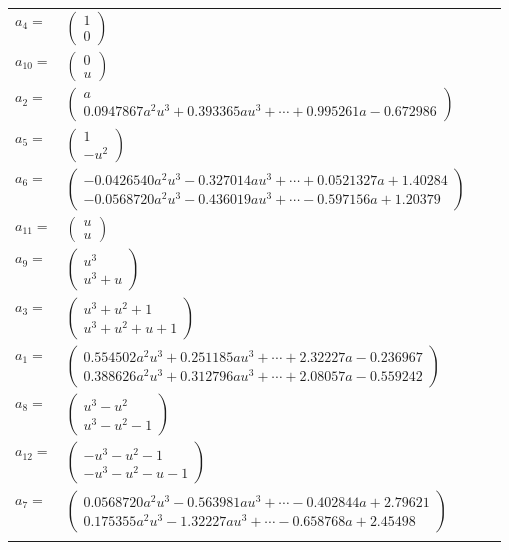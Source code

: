\documentclass[1p]{elsarticle_modified}
\theoremstyle{definition}
\begin{document}
\begin{tabular}{m{7pt} m{180pt} m{7pt} m{180pt} }
\flushright $a_{4}=$&$\begin{pmatrix}1\\0\end{pmatrix}$ \\
\flushright $a_{10}=$&$\begin{pmatrix}0\\u\end{pmatrix}$ \\
\flushright $a_{2}=$&$\begin{pmatrix}a\\0.0947867 a^{2} u^{3}+0.393365 a u^{3}+\cdots+0.995261 a-0.672986\end{pmatrix}$ \\
\flushright $a_{5}=$&$\begin{pmatrix}1\\- u^2\end{pmatrix}$ \\
\flushright $a_{6}=$&$\begin{pmatrix}-0.0426540 a^{2} u^{3}-0.327014 a u^{3}+\cdots+0.0521327 a+1.40284\\-0.0568720 a^{2} u^{3}-0.436019 a u^{3}+\cdots-0.597156 a+1.20379\end{pmatrix}$ \\
\flushright $a_{11}=$&$\begin{pmatrix}u\\u\end{pmatrix}$ \\
\flushright $a_{9}=$&$\begin{pmatrix}u^3\\u^3+u\end{pmatrix}$ \\
\flushright $a_{3}=$&$\begin{pmatrix}u^3+u^2+1\\u^3+u^2+u+1\end{pmatrix}$ \\
\flushright $a_{1}=$&$\begin{pmatrix}0.554502 a^{2} u^{3}+0.251185 a u^{3}+\cdots+2.32227 a-0.236967\\0.388626 a^{2} u^{3}+0.312796 a u^{3}+\cdots+2.08057 a-0.559242\end{pmatrix}$ \\
\flushright $a_{8}=$&$\begin{pmatrix}u^3- u^2\\u^3- u^2-1\end{pmatrix}$ \\
\flushright $a_{12}=$&$\begin{pmatrix}- u^3- u^2-1\\- u^3- u^2- u-1\end{pmatrix}$ \\
\flushright $a_{7}=$&$\begin{pmatrix}0.0568720 a^{2} u^{3}-0.563981 a u^{3}+\cdots-0.402844 a+2.79621\\0.175355 a^{2} u^{3}-1.32227 a u^{3}+\cdots-0.658768 a+2.45498\end{pmatrix}$\\&\end{tabular}
\end{document}
